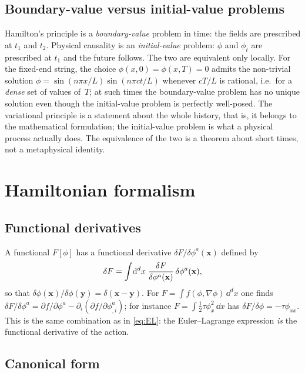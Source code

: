 \subsection{Boundary-value versus initial-value problems}

Hamilton's principle is a \emph{boundary-value} problem in time: the fields are
prescribed at $t_1$ and $t_2$. Physical causality is an \emph{initial-value}
problem: $\phi$ and $\phi_t$ are prescribed at $t_1$ and the future follows. The
two are equivalent only locally. For the fixed-end string, the choice
$\phi(x,0)=\phi(x,T)=0$ admits the non-trivial solution
$\phi=\sin(n\pi x/L)\sin(n\pi ct/L)$ whenever $cT/L$ is rational, i.e.\ for a
\emph{dense} set of values of~$T$; at such times the boundary-value problem has
no unique solution even though the initial-value problem is perfectly
well-posed. The variational principle is a statement about the whole history,
that is, it belongs to the mathematical formulation; the initial-value problem is
what a physical process actually does. The equivalence of the two is a theorem about
short times, not a metaphysical identity.

\section{Hamiltonian formalism}
\label{sec:hamiltonian}

\subsection{Functional derivatives}

A functional $F[\phi]$ has a functional derivative $\delta F/\delta\phi^a(\mathbf{x})$
defined by
\begin{equation}
  \delta F=\int\!\mathrm{d}^dx\;\frac{\delta F}{\delta \phi^a(\mathbf{x})}\,\delta\phi^a(\mathbf{x}),
\end{equation}
so that $\delta\phi(\mathbf{x})/\delta\phi(\mathbf{y})=\delta(\mathbf{x}-\mathbf{y})$.
For $F=\int f(\phi,\nabla\phi)\,\dd^dx$ one finds
$\delta F/\delta\phi^a=\partial f/\partial\phi^a-\partial_i(\partial f/\partial\phi^a_{,i})$;
for instance $F=\int\tfrac12\tau\phi_x^2\,\dd x$ has $\delta F/\delta\phi=-\tau\phi_{xx}$.
This is the same combination as in \eqref{eq:EL}: the Euler--Lagrange expression
\emph{is} the functional derivative of the action.

\subsection{Canonical form}

